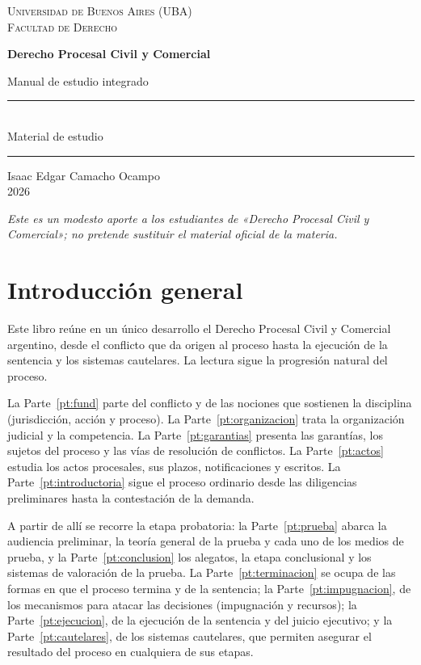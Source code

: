 \documentclass[12pt,oneside]{book}
\newcommand{\universidad}{Universidad de Buenos Aires (UBA)}
\newcommand{\facultad}{Facultad de Derecho}
\newcommand{\titulo}{Derecho Procesal Civil y Comercial}
\newcommand{\subtitulo}{Manual de estudio integrado}
\newcommand{\autor}{Isaac Edgar Camacho Ocampo}
\newcommand{\anio}{2026}
\begin{document}
\begin{titlepage}
\thispagestyle{empty}
\begin{center}
\vspace*{1cm}
{\large \textsc{\universidad}}\\[0.2cm]
{\large \textsc{\facultad}}
\vspace{3cm}

{\Huge \textbf{\titulo}}
\vspace{0.8cm}

{\Large \subtitulo}
\vspace{1.2cm}

\rule{0.70\textwidth}{0.5pt}\\[0.4cm]
{\large Material de estudio}\\[0.4cm]
\rule{0.70\textwidth}{0.5pt}
\vfill
{\large \autor}\\[0.3cm]
{\large \anio}
\end{center}
\vfill
\begin{flushleft}
\textit{Este es un modesto aporte a los estudiantes de «Derecho Procesal Civil y Comercial»; no pretende sustituir el material oficial de la materia.}
\end{flushleft}
\end{titlepage}

\frontmatter
\tableofcontents
\mainmatter

\chapter*{Introducción general}
Este libro reúne en un único desarrollo el Derecho Procesal Civil y Comercial argentino, desde el conflicto que da origen al proceso hasta la ejecución de la sentencia y los sistemas cautelares. La lectura sigue la progresión natural del proceso.

La Parte~\ref{pt:fund} parte del conflicto y de las nociones que sostienen la disciplina (jurisdicción, acción y proceso). La Parte~\ref{pt:organizacion} trata la organización judicial y la competencia. La Parte~\ref{pt:garantias} presenta las garantías, los sujetos del proceso y las vías de resolución de conflictos. La Parte~\ref{pt:actos} estudia los actos procesales, sus plazos, notificaciones y escritos. La Parte~\ref{pt:introductoria} sigue el proceso ordinario desde las diligencias preliminares hasta la contestación de la demanda.

A partir de allí se recorre la etapa probatoria: la Parte~\ref{pt:prueba} abarca la audiencia preliminar, la teoría general de la prueba y cada uno de los medios de prueba, y la Parte~\ref{pt:conclusion} los alegatos, la etapa conclusional y los sistemas de valoración de la prueba. La Parte~\ref{pt:terminacion} se ocupa de las formas en que el proceso termina y de la sentencia; la Parte~\ref{pt:impugnacion}, de los mecanismos para atacar las decisiones (impugnación y recursos); la Parte~\ref{pt:ejecucion}, de la ejecución de la sentencia y del juicio ejecutivo; y la Parte~\ref{pt:cautelares}, de los sistemas cautelares, que permiten asegurar el resultado del proceso en cualquiera de sus etapas.
\end{document}
